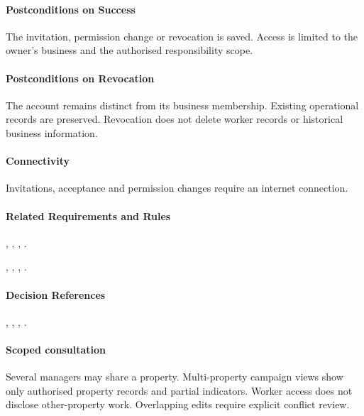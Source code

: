 \paragraph{Postconditions on Success}

The invitation, permission change or revocation is saved.
    Access is limited to the owner's business and the
    authorised responsibility scope.

\paragraph{Postconditions on Revocation}

The account remains distinct from its business membership.
    Existing operational records are preserved.
    Revocation does not delete worker records or historical
    business information.

\paragraph{Connectivity}

Invitations, acceptance and permission changes require
    an internet connection.

\paragraph{Related Requirements and Rules}
\hyperref[fr:004]{}, \hyperref[fr:006]{}, \hyperref[fr:007]{}, \hyperref[fr:008]{}.

\hyperref[br:001]{}, \hyperref[br:002]{}, \hyperref[br:003]{}, \hyperref[br:004]{}.

\paragraph{Decision References}
, , , .

\paragraph{Scoped consultation}
Several managers may share a property. Multi-property campaign views show only
authorised property records and partial indicators. Worker access does not disclose
other-property work. Overlapping edits require explicit conflict review.
